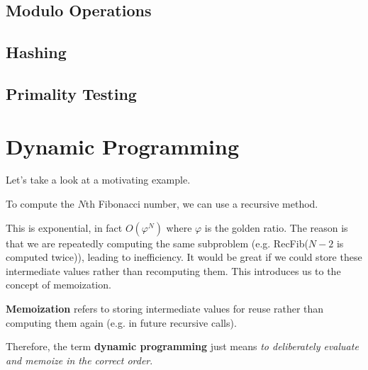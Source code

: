 \documentclass{article}
\begin{document}
  \subsection{Modulo Operations}
  
  \subsection{Hashing}

  \subsection{Primality Testing}

\section{Dynamic Programming}
  
    Let's take a look at a motivating example. 

    \begin{example}
      To compute the $N$th Fibonacci number, we can use a recursive method. 
      \begin{algorithm}[H]
        \caption{}
        \label{alg:recfib}
        \begin{algorithmic}
          \State 
              \State {}
              \State {}
            \Else 
              \State {}
            \EndIf
          \EndFunction
        \end{algorithmic}
      \end{algorithm}
    \end{example}

    This is exponential, in fact $O(\varphi^N)$ where $\varphi$ is the golden ratio. The reason is that we are repeatedly computing the same subproblem (e.g. RecFib($N-2$ is computed twice)), leading to inefficiency. It would be great if we could store these intermediate values rather than recomputing them. This introduces us to the concept of memoization. 

    \begin{definition}[Memoization]
      \textbf{Memoization} refers to storing intermediate values for reuse rather than computing them again (e.g. in future recursive calls). 
      
      Therefore, the term \textbf{dynamic programming} just means \textit{to deliberately evaluate and memoize in the correct order}. 
    \end{definition}
\end{document}
